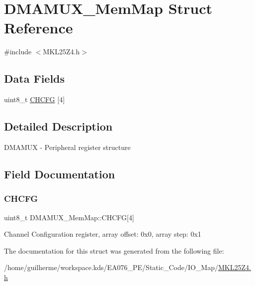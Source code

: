 \hypertarget{struct_d_m_a_m_u_x___mem_map}{}\section{D\+M\+A\+M\+U\+X\+\_\+\+Mem\+Map Struct Reference}
\label{struct_d_m_a_m_u_x___mem_map}


{\ttfamily \#include $<$M\+K\+L25\+Z4.\+h$>$}

\subsection*{Data Fields}
\begin{DoxyCompactItemize}
\item 
uint8\+\_\+t \hyperlink{struct_d_m_a_m_u_x___mem_map_afba9e1d292878648fca1bb42c6ac45da}{C\+H\+C\+FG} \mbox{[}4\mbox{]}
\end{DoxyCompactItemize}


\subsection{Detailed Description}
D\+M\+A\+M\+UX -\/ Peripheral register structure 

\subsection{Field Documentation}
\mbox{\label{struct_d_m_a_m_u_x___mem_map_afba9e1d292878648fca1bb42c6ac45da}} 
\subsubsection{\texorpdfstring{C\+H\+C\+FG}{CHCFG}}
{\footnotesize\ttfamily uint8\+\_\+t D\+M\+A\+M\+U\+X\+\_\+\+Mem\+Map\+::\+C\+H\+C\+FG\mbox{[}4\mbox{]}}

Channel Configuration register, array offset\+: 0x0, array step\+: 0x1 

The documentation for this struct was generated from the following file\+:\begin{DoxyCompactItemize}
\item 
/home/guilherme/workspace.\+kds/\+E\+A076\+\_\+\+P\+E/\+Static\+\_\+\+Code/\+I\+O\+\_\+\+Map/\hyperlink{_m_k_l25_z4_8h}{M\+K\+L25\+Z4.\+h}\end{DoxyCompactItemize}

